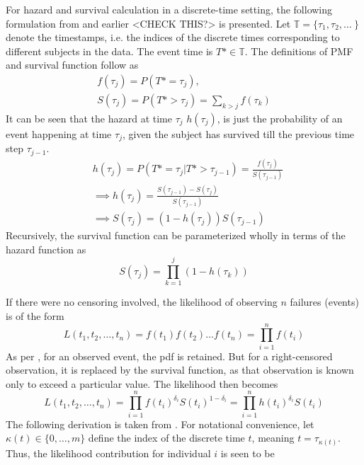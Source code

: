 \documentclass[%
 reprint,
 amsmath,amssymb,
 aps,
]{revtex4-2}
\begin{document}
For hazard and survival calculation in a discrete-time setting, the following formulation from \cite{kvamme_continuous_2019} and earlier \cite{Gensheimer_Narasimhan_2019}<CHECK THIS?> is presented. Let $\mathbb{T} = \{\tau_1, \tau_2, \ldots\ \}$ denote the timestamps, i.e. the indices of the discrete times corresponding to different subjects in the data. The event time is $T*\in\mathbb{T}$. The definitions of PMF and survival function follow as
\begin{gather*}
f(\tau_j) = P(T* = \tau_j),\\
S(\tau_j) = P(T* >\tau_j) = \sum_{k>j}f(\tau_k)
\end{gather*}
It can be seen that the hazard at time $\tau_j$ $h(\tau_j)$, is just the probability of an event happening at time $\tau_j$, given the subject has survived till the previous time step $\tau_{j-1}$. 
\begin{align}
&h(\tau_j) = P(T* = \tau_j | T* > \tau_{j-1}) = \frac{f(\tau_j)}{S(\tau_{j-1})} \label{haz_cond_proba}\\
&\implies  h(\tau_j) = \frac{S(\tau_{j-1}) - S(\tau_j)}{S(\tau_{j-1})}\\
&\implies S(\tau_j) = (1 - h(\tau_j))S(\tau_{j-1})
\end{align}
Recursively, the survival function can be parameterized wholly in terms of the hazard function as
\[
S(\tau_j) = \prod_{k=1}^{j}(1 - h(\tau_k))
\]

If there were no censoring involved, the likelihood of observing $n$ failures (events) is of the form
\[
L(t_1 , t_2 , \ldots , t_n) = f(t_1)f(t_2)\ldots f(t_n)=\prod^{n}_{i=1}f(t_i)
\]
As per \cite{Moore_2016}, for an observed event, the pdf is retained. But for a right-censored observation, it is replaced by the survival function, as that observation is known only to exceed a particular value. The likelihood then becomes
\[
L(t_1 , t_2 , \ldots , t_n) = \prod^{n}_{i=1}f(t_i)^{\delta_i}S(t_i)^{1-\delta_i}=\prod^{n}_{i=1}h(t_i)^{\delta_i}S(t_i)
\]
The following derivation is taken from \cite{kvamme_continuous_2019}. For notational convenience, let $\kappa(t) \in \{0, \ldots , m\}$ define the index of the discrete time $t$, meaning $t = \tau_{\kappa(t)}$. Thus, the likelihood contribution for individual $i$ is seen to be 
\end{document}
